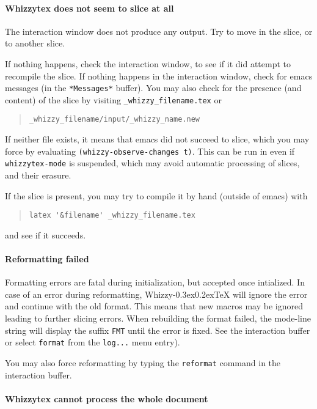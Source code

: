 \documentclass{article}
\makeatletter
\let \lst \verb
\def \whizzy {{Whizzy\kern -0.3ex\raise 0.2ex\hbox{\let \@\relax\TeX}}}
\makeatother
\begin{document}
\paragraph {Whizzytex does not seem to slice at all}

The interaction window does not produce any output. 
Try to move in the slice, or to another slice. 

If nothing happens, check the interaction
window, to see if it did attempt to recompile the slice.
If nothing happens in the interaction window, check for emacs messages
(in the \lst"*Messages*" buffer). You may also check for the presence 
(and content) of the slice by visiting 
\lst"_whizzy_filename.tex" or
\begin{quote}
\begin{verbatim}
_whizzy_filename/input/_whizzy_name.new
\end{verbatim}
\end{quote}
If neither file exists, it means that emacs did
not succeed to slice, which you may force by evaluating
\lst"(whizzy-observe-changes t)". 
This can be run in even if {\tt whizzytex-mode} is suspended, which may
avoid automatic processing of slices, and their erasure.

If the slice is present, you may try to compile it by hand (outside of
emacs) with 
\begin{quote}
\begin{verbatim}
latex '&filename' _whizzy_filename.tex
\end{verbatim}
\end{quote}
and see if it succeeds. 


\paragraph {Reformatting failed}

Formatting errors are fatal during initialization, but accepted once
intialized. In case of an error during reformatting, {\whizzy} will ignore
the error and continue with the old format.  This means that new macros may
be ignored leading to further slicing errors. When rebuilding the format
failed, the mode-line string will display the suffix \lst"FMT" until the
error is fixed.  See the interaction buffer or select \lst"format" from the
\lst"log..." menu entry).

You may also force reformatting by typing the \lst"reformat" command
in the interaction buffer. 


\paragraph {Whizzytex cannot process the whole document}
\end{document}
